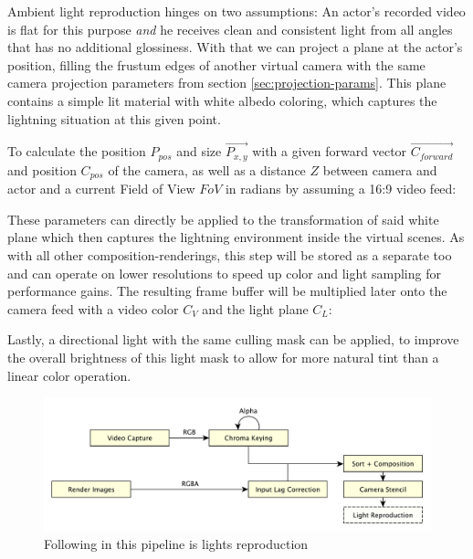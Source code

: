 Ambient light reproduction hinges on two assumptions: An actor's recorded video 
is flat for this purpose \textit{and} he receives clean and consistent light 
from all angles that has no additional glossiness. With that we can project a 
plane at the actor's position, filling the frustum edges of another virtual 
camera with the same camera projection parameters from section 
\ref{sec:projection-params}. This plane contains a simple lit material with 
white albedo coloring, which captures the lightning situation at this given 
point.

To calculate the position $P_{pos}$ and size $\vec{P_{x, y}}$ with a 
given forward vector $\vec{C_{forward}}$ and position $C_{pos}$ of the 
camera, as well as a distance $Z$ between camera and actor and a current Field 
of View $FoV$ in radians by assuming a 16:9 video feed:



These parameters can directly be applied to the transformation of said white 
plane which then captures the lightning environment inside the virtual scenes. 
As with all other composition-renderings, this step will be stored as a 
separate  too and can operate on lower resolutions to speed 
up color and light sampling for performance gains.
\newline
The resulting frame buffer will be multiplied later onto the camera feed with a 
video color $C_V$ and the light plane $C_L$:


Lastly, a directional light with the same culling mask can be applied, to 
improve the overall brightness of this light mask to allow for more natural 
tint than a linear color operation.

\begin{figure}[htb]
	\includegraphics[width=\textwidth]{_raw_resources/pipeline_steps/4_7_lights.pdf}
	\caption{Following in this pipeline is lights reproduction}
	\label{fig:steps:lights}
\end{figure}
